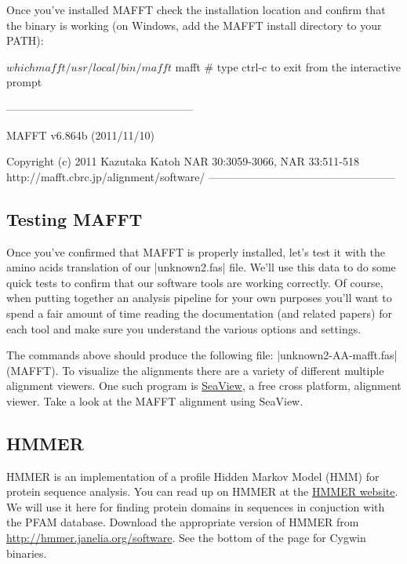 Once you've installed MAFFT check the installation location and confirm that the binary is working (on Windows, add the MAFFT install directory to your PATH):
%
\begin{code}
$ which mafft
/usr/local/bin/mafft
$ mafft  # type ctrl-c to exit from the interactive prompt

---------------------------------------------------

   MAFFT v6.864b (2011/11/10)

        Copyright (c) 2011 Kazutaka Katoh
        NAR 30:3059-3066, NAR 33:511-518
        http://mafft.cbrc.jp/alignment/software/
---------------------------------------------------
\end{code}

\subsection{Testing MAFFT}

Once you've confirmed that MAFFT is properly installed, let's test it with the amino acids translation of our |unknown2.fas| file. We'll use this data to do some quick tests to confirm that our software tools are working correctly. Of course, when putting together an analysis pipeline for your own purposes you'll want to spend a fair amount of time reading the documentation (and related papers) for each tool and make sure you understand the various options and settings.
%
%
The commands above should produce the following file: |unknown2-AA-mafft.fas| (MAFFT).  To visualize the alignments there are a variety of different multiple alignment viewers. One such program is \href{http://pbil.univ-lyon1.fr/software/seaview.html}{SeaView}, a free cross platform,  alignment viewer.  Take a look at the MAFFT alignment using SeaView.


\subsection{HMMER}

HMMER is an implementation of a profile Hidden Markov Model (HMM) for protein sequence analysis. You can read up on HMMER at the \href{http://hmmer.janelia.org/}{HMMER website}. We will use it here for finding protein domains in sequences in conjuction with the PFAM database. Download the appropriate version of HMMER from \url{http://hmmer.janelia.org/software}.  See the bottom of the page for Cygwin binaries.


